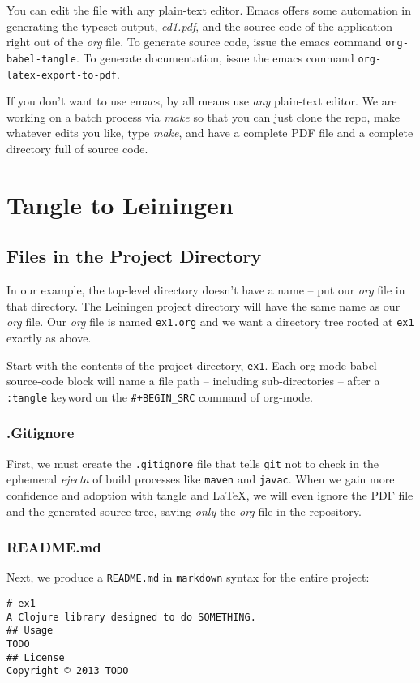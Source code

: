 \documentclass[11pt]{article}
\begin{document}
You can edit the file with any plain-text editor. Emacs offers some
automation in generating the typeset output, \emph{ed1.pdf}, and the
source code of the application right out of the \emph{org} file. To
generate source code, issue the emacs command
\verb|org-babel-tangle|. To generate documentation, issue the emacs
command \verb|org-latex-export-to-pdf|.

If you don't want to use emacs, by all means use \emph{any} plain-text
editor. We are working on a batch process via \emph{make} so that you can
just clone the repo, make whatever edits you like, type \emph{make}, and
have a complete PDF file and a complete directory full of source
code.
\section{Tangle to Leiningen}
\label{sec-2}

\subsection{Files in the Project Directory}
\label{sec-2-1}
In our example, the top-level directory doesn't have a name -- 
put our \emph{org} file in that directory. The Leiningen project directory
will have the same name as our \emph{org} file. Our \emph{org} file is named
\verb+ex1.org+ and we want a directory tree rooted at \verb+ex1+
exactly as above.

Start with the contents of the project directory, \verb+ex1+. Each
org-mode babel source-code block will name a file path -- including
sub-directories -- after a \verb+:tangle+ keyword on the
\texttt{\#+BEGIN\_SRC} command of org-mode.
\subsubsection{.Gitignore}
\label{sec-2-1-1}
First, we must create the \verb+.gitignore+ file that tells
\verb+git+ not to check in the ephemeral \emph{ejecta} of build
processes like \verb+maven+ and \verb+javac+. When we gain more
confidence and adoption with tangle and \LaTeX{}, we will even
ignore the PDF file and the generated source tree, saving \emph{only}
the \emph{org} file in the repository.

\subsubsection{README.md}
\label{sec-2-1-2}
Next, we produce a \verb+README.md+ in \verb+markdown+ syntax for
the entire project:
\begin{verbatim}
# ex1
A Clojure library designed to do SOMETHING. 
## Usage
TODO
## License
Copyright © 2013 TODO
\end{verbatim}
\end{document}
